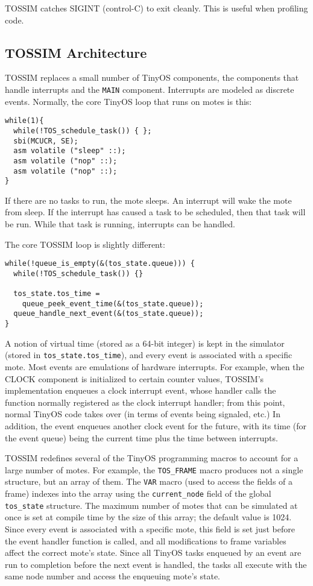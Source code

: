 \documentclass[12pt]{article}
\begin{document}
TOSSIM catches SIGINT (control-C) to exit cleanly. This is useful when
profiling code.

\subsection*{TOSSIM Architecture}

TOSSIM replaces a small number of TinyOS components, the components
that handle interrupts and the {\tt MAIN} component. Interrupts are
modeled as discrete events. Normally, the core TinyOS loop that runs
on motes is this:


\begin{verbatim}
while(1){
  while(!TOS_schedule_task()) { };
  sbi(MCUCR, SE);
  asm volatile ("sleep" ::);
  asm volatile ("nop" ::);
  asm volatile ("nop" ::);
}
\end{verbatim}


If there are no tasks to run, the mote sleeps. An interrupt will wake
the mote from sleep. If the interrupt has caused a task to be
scheduled, then that task will be run. While that task is running,
interrupts can be handled.

The core TOSSIM loop is slightly different:


\begin{verbatim}
while(!queue_is_empty(&(tos_state.queue))) {
  while(!TOS_schedule_task()) {}

  tos_state.tos_time =
    queue_peek_event_time(&(tos_state.queue));
  queue_handle_next_event(&(tos_state.queue));
}
\end{verbatim}



A notion of virtual time (stored as a 64-bit integer) is kept in the
simulator (stored in {\tt tos\_state.tos\_time}), and every event is
associated with a specific mote. Most events are emulations of
hardware interrupts. For example, when the CLOCK component is
initialized to certain counter values, TOSSIM's implementation
enqueues a clock interrupt event, whose handler calls the function
normally registered as the clock interrupt handler; from this point,
normal TinyOS code takes over (in terms of events being signaled,
etc.) In addition, the event enqueues another clock event for the
future, with its time (for the event queue) being the current time
plus the time between interrupts.

TOSSIM redefines several of the TinyOS programming macros to account
for a large number of motes. For example, the {\tt TOS\_FRAME} macro
produces not a single structure, but an array of them. The {\tt VAR}
macro (used to access the fields of a frame) indexes into the array
using the {\tt current\_node} field of the global {\tt tos\_state}
structure. The maximum number of motes that can be simulated at once
is set at compile time by the size of this array; the default value is
1024. Since every event is associated with a specific mote, this field
is set just before the event handler function is called, and all
modifications to frame variables affect the correct mote's
state. Since all TinyOS tasks enqueued by an event are run to
completion before the next event is handled, the tasks all execute
with the same node number and access the enqueuing mote's state.
\end{document}
